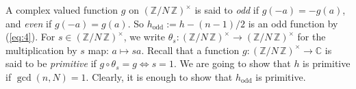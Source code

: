 \documentclass{amsart}[11pt]
\theoremstyle{definition}
\numberwithin{equation}{section}
\theoremstyle{notitle}
\begin{document}
A complex valued function $g$ on ${(\mathbb{Z}/ {N}\, \mathbb{Z})^\times}$ is said to \textit{odd} if
$g(-a)=-g(a)$, and \textit{even} if $g(-a)=g(a)$.  So
$h_{\mathrm{odd}}:=h-(n-1)/2$ is an odd function by (\ref{eq:4}).  For $s\in
{(\mathbb{Z}/ {N}\, \mathbb{Z})^\times}$, we write $\theta_s: {(\mathbb{Z}/ {N}\, \mathbb{Z})^\times}\to {(\mathbb{Z}/ {N}\, \mathbb{Z})^\times}$ for the
multiplication by $s$ map: $a\mapsto sa$.  Recall that a function
$g:{(\mathbb{Z}/ {N}\, \mathbb{Z})^\times}\to {\mathbb{C}}$ is said to be \textit{primitive} if $g\circ
\theta_s = g \Leftrightarrow s=1$.  We are going to show that $h$ is
primitive if $\gcd(n,N)=1$. Clearly, it is enough to show that
$h_{\mathrm{odd}}$ is primitive.  

  
  
  
  
  
  
\end{document}
